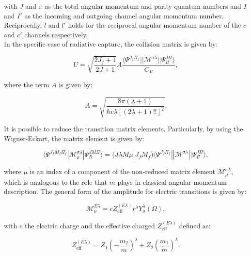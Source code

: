 \documentclass[openany]{book}
\begin{document}
with $J$ and $\pi$ as the total angular momentum and parity quantum numbers and $I$ and $I'$ as the incoming and outgoing channel angular momentum number. Reciprocally, $l$ and $l'$ holds for the reciprocal angular momentum number of the $c$ and $c'$ channels respectively.\\

In the specific case of radiative capture, the collision matrix is given by: 

\begin{equation}\label{rmatrix_radiativeCapture_U}
	U = \sqrt{\frac{2J_f + 1}{2J + 1}} A \frac{\langle \Psi^{J_f\Pi_f} || \mathcal{M}^{\sigma \lambda} ||  \Psi^{J \Pi}_{Il} \rangle }{C_{Il}},
\end{equation}

where the term $A$ is given by:

\begin{equation}\label{rmatrix_radiativeCapture_A}
	A = \sqrt{\frac{8\pi(\lambda + 1)}{\hbar v \lambda [(2\lambda + 1)!!]^2}}.
\end{equation}

It is possible to reduce the transition matrix elements. Particularly, by using the Wigner-Eckart, the matrix element is given by:

\begin{equation}\label{rmatrix_radiativeCapture_transitionMatrix}
	\langle \Psi^{J_fM_f\Pi_f} | \mathcal{M}^{\sigma \lambda}_\mu |  \Psi^{J M \Pi}_{Il} \rangle = (J\lambda M \mu | J_fM_f) \langle \Psi^{J_f\Pi_f} || \mathcal{M}^{\sigma \lambda} ||  \Psi^{J \Pi}_{Il} \rangle,
\end{equation}

where $\mu$ is an index of a component of the non-reduced matrix element $\mathcal{M}^{\sigma \lambda}_{\mu}$, which is analogous to the role that $m$ plays in classical angular momentum description. The general form of the amplitude for electric transitions is given by: 

\begin{equation}\label{rmatrix_radiativeCapture_M}
	\mathcal{M}^{E\lambda}_{\mu} = eZ^{(E\lambda)}_{\mathrm{eff}} r^{\lambda} Y^{\lambda}_{\mu} (\Omega),
\end{equation}

with $e$ the electric charge and the effective charged $Z^{(E\lambda)}_{\mathrm{eff}}$ defined as: 

\begin{equation}\label{rmatrix_radiativeCapture_effectiveCharge}
		Z^{(E\lambda)}_{\mathrm{eff}} = Z_1\left(- \frac{m_2}{m}\right)^{\lambda} + Z_2 \left(\frac{m_1}{m}\right)^{\lambda}.
\end{equation}
\end{document}
